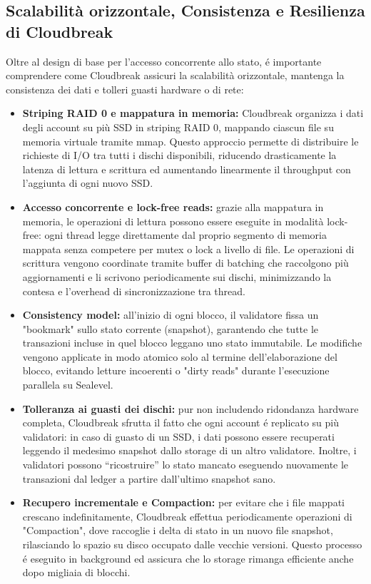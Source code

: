 \documentclass[a4paper,12pt]{report}
\begin{document}
	\subsection{Scalabilità orizzontale, Consistenza e Resilienza di Cloudbreak}
	Oltre al design di base per l'accesso concorrente allo stato, é importante comprendere come Cloudbreak assicuri la scalabilità orizzontale, mantenga la consistenza dei dati e tolleri guasti hardware o di rete:
	\begin{itemize}
		\item \textbf{Striping RAID 0 e mappatura in memoria:} Cloudbreak organizza i dati degli account su più SSD in striping RAID 0, mappando ciascun file su memoria virtuale tramite mmap. Questo approccio permette di distribuire le richieste di I/O tra tutti i dischi disponibili, riducendo drasticamente la latenza di lettura e scrittura ed aumentando linearmente il throughput con l’aggiunta di ogni nuovo SSD.
		\item \textbf{Accesso concorrente e lock-free reads:} grazie alla mappatura in memoria, le operazioni di lettura possono essere eseguite in modalità lock-free: ogni thread legge direttamente dal proprio segmento di memoria mappata senza competere per mutex o lock a livello di file. Le operazioni di scrittura vengono coordinate tramite buffer di batching che raccolgono più aggiornamenti e li scrivono periodicamente sui dischi, minimizzando la contesa e l’overhead di sincronizzazione tra thread.
		\item \textbf{Consistency model:} all’inizio di ogni blocco, il validatore fissa un "bookmark" sullo stato corrente (snapshot), garantendo che tutte le transazioni incluse in quel blocco leggano uno stato immutabile. Le modifiche vengono applicate in modo atomico solo al termine dell’elaborazione del blocco, evitando letture incoerenti o "dirty reads" durante l’esecuzione parallela su Sealevel.
		\item \textbf{Tolleranza ai guasti dei dischi:} pur non includendo ridondanza hardware completa, Cloudbreak sfrutta il fatto che ogni account é replicato su più validatori: in caso di guasto di un SSD, i dati possono essere recuperati leggendo il medesimo snapshot dallo storage di un altro validatore. Inoltre, i validatori possono “ricostruire” lo stato mancato eseguendo nuovamente le transazioni dal ledger a partire dall’ultimo snapshot sano.
		\item \textbf{Recupero incrementale e Compaction:} per evitare che i file mappati crescano indefinitamente, Cloudbreak effettua periodicamente operazioni di "Compaction", dove raccoglie i delta di stato in un nuovo file snapshot, rilasciando lo spazio su disco occupato dalle vecchie versioni. Questo processo é eseguito in background ed assicura che lo storage rimanga efficiente anche dopo migliaia di blocchi.
	\end{itemize}
	
\end{document}
